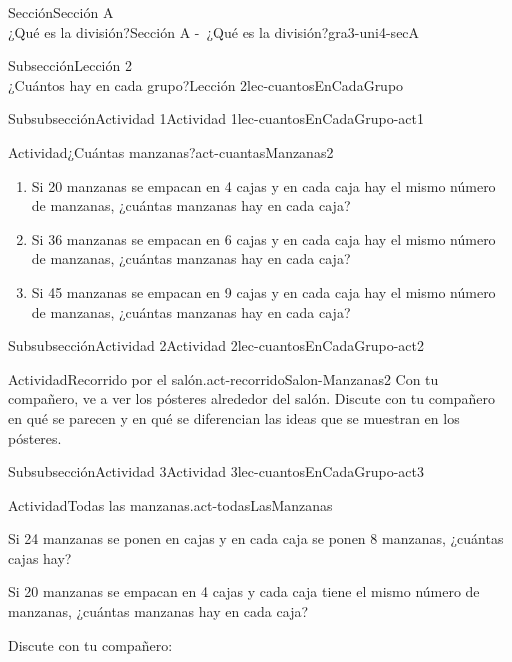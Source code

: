 \begin{sectionptx}{Sección}{{\Large Sección A\\}¿Qué es la división?}{}{Sección A -~¿Qué es la división?}{}{}{gra3-uni4-secA}
\begin{subsectionptx}{Subsección}{{\normalsize Lección 2\\[-0.05cm]}¿Cuántos hay en cada grupo?}{}{Lección 2}{}{}{lec-cuantosEnCadaGrupo}
\begin{subsubsectionptx}{Subsubsección}{Actividad 1}{}{Actividad 1}{}{}{lec-cuantosEnCadaGrupo-act1}
\begin{activity}{Actividad}{¿Cuántas manzanas?}{act-cuantasManzanas2}
%
\begin{enumerate}
\item{}Si 20 manzanas se empacan en 4 cajas y en cada caja hay el mismo número de manzanas, ¿cuántas manzanas hay en cada caja?%
\item{}Si 36 manzanas se empacan en 6 cajas y en cada caja hay el mismo número de manzanas, ¿cuántas manzanas hay en cada caja?%
\item{}Si 45 manzanas se empacan en 9 cajas y en cada caja hay el mismo número de manzanas, ¿cuántas manzanas hay en cada caja?%
\end{enumerate}
%
\end{activity}%
\end{subsubsectionptx}
%
%
\typeout{************************************************}
\typeout{************************************************}
%
\begin{subsubsectionptx}{Subsubsección}{Actividad 2}{}{Actividad 2}{}{}{lec-cuantosEnCadaGrupo-act2}
\begin{activity}{Actividad}{Recorrido por el salón.}{act-recorridoSalon-Manzanas2}%
Con tu compañero, ve a ver los pósteres alrededor del salón. Discute con tu compañero en qué se parecen y en qué se diferencian las ideas que se muestran en los pósteres.%
\end{activity}%
\end{subsubsectionptx}
%
%
\typeout{************************************************}
\typeout{************************************************}
%
\begin{subsubsectionptx}{Subsubsección}{Actividad 3}{}{Actividad 3}{}{}{lec-cuantosEnCadaGrupo-act3}
\begin{activity}{Actividad}{Todas las manzanas.}{act-todasLasManzanas}%
\begin{sidebyside}{2}{0.05}{0.05}{0.1}%
\begin{sbspanel}{0.4}%
Si 24 manzanas se ponen en cajas y en cada caja se ponen 8 manzanas, ¿cuántas cajas hay?%
\end{sbspanel}%
\begin{sbspanel}{0.4}%
\par
Si 20 manzanas se empacan en 4 cajas y cada caja tiene el mismo número de manzanas, ¿cuántas manzanas hay en cada caja?%
\end{sbspanel}%
\end{sidebyside}%
\par
Discute con tu compañero:%
\par

\end{activity}
\end{subsubsectionptx}
\end{subsectionptx}
\end{sectionptx}
